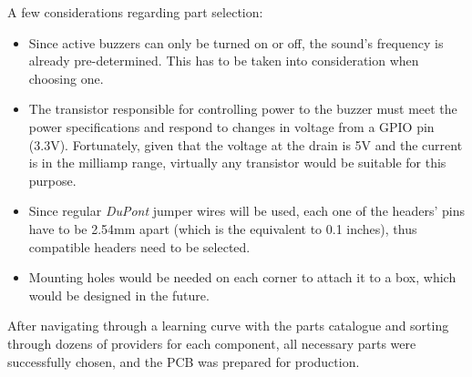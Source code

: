 A few considerations regarding part selection:
\begin{itemize}
    \item Since active buzzers can only be turned on or off, the sound's frequency is already pre-determined. 
    This has to be taken into consideration when choosing one.
    \item The transistor responsible for controlling power to the buzzer must meet the power specifications 
    and respond to changes in voltage from a GPIO pin (3.3V). Fortunately, given that the voltage at the 
    drain is 5V and the current is in the milliamp range, virtually any transistor would be suitable for 
    this purpose.
    \item Since regular \textit{DuPont} jumper wires will be used, each one of the headers' pins have to be 
    2.54mm apart (which is the equivalent to 0.1 inches), thus compatible headers need to be selected.
    \item Mounting holes would be needed on each corner to attach it to a box, which would be designed in 
    the future.
\end{itemize}

After navigating through a learning curve with the parts catalogue and sorting through dozens of providers 
for each component, all necessary parts were successfully chosen, and the PCB was prepared for production.

